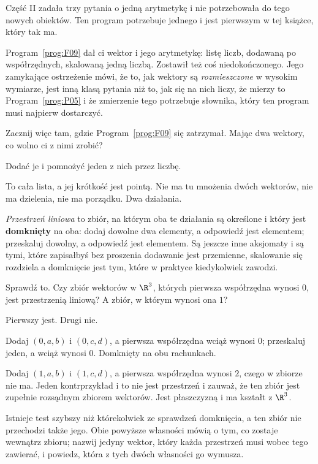 \begin{fr}
Część II zadała trzy pytania o jedną arytmetykę i nie potrzebowała do tego
nowych obiektów. Ten program potrzebuje jednego i jest pierwszym w tej książce,
który tak ma.

Program~\ref{prog:F09} dał ci wektor i jego arytmetykę: listę liczb, dodawaną
po współrzędnych, skalowaną jedną liczbą. Zostawił też coś niedokończonego.
Jego zamykające ostrzeżenie mówi, że to, jak wektory są \emph{rozmieszczone} w
wysokim wymiarze, jest inną klasą pytania niż to, jak się na nich liczy, że
mierzy to Program~\ref{prog:P05} i że zmierzenie tego potrzebuje słownika,
który ten program musi najpierw dostarczyć.

Zacznij więc tam, gdzie Program~\ref{prog:F09} się zatrzymał. Mając dwa
wektory, co wolno ci z nimi zrobić?
\nextframe
\end{fr}

\begin{fr}
\begin{ansblock}
Dodać je i pomnożyć jeden z nich przez liczbę.
\end{ansblock}

To cała lista, a jej krótkość jest pointą. Nie ma tu mnożenia dwóch wektorów,
nie ma dzielenia, nie ma porządku. Dwa działania.

\emph{Przestrzeń liniowa} to zbiór, na którym oba te działania są określone i
który jest \textbf{domknięty} na oba: dodaj dowolne dwa elementy, a odpowiedź
jest elementem; przeskaluj dowolny, a odpowiedź jest elementem. Są jeszcze inne
aksjomaty i są tymi, które zapisałbyś bez proszenia \dash{} dodawanie jest
przemienne, skalowanie się rozdziela \dash{} a domknięcie jest tym, które w
praktyce kiedykolwiek zawodzi.

Sprawdź to. Czy zbiór wektorów w $\R^{3}$, których pierwsza współrzędna wynosi
$0$, jest przestrzenią liniową? A zbiór, w którym wynosi ona $1$?
\nextframe
\end{fr}

\begin{fr}
\begin{ansblock}
Pierwszy jest. Drugi nie.
\end{ansblock}

Dodaj $(0, a, b)$ i $(0, c, d)$, a pierwsza współrzędna wciąż wynosi $0$;
przeskaluj jeden, a wciąż wynosi $0$. Domknięty na obu rachunkach.

Dodaj $(1, a, b)$ i $(1, c, d)$, a pierwsza współrzędna wynosi $2$, czego w
zbiorze nie ma. Jeden kontrprzykład i to nie jest przestrzeń \dash{} i zauważ,
że ten zbiór jest zupełnie rozsądnym zbiorem wektorów. Jest płaszczyzną i ma
kształt z $\R^{3}$.

Istnieje test szybszy niż którekolwiek ze sprawdzeń domknięcia, a ten zbiór nie
przechodzi także jego. Obie powyższe własności mówią o tym, co zostaje wewnątrz
zbioru; nazwij jedyny wektor, który każda przestrzeń musi wobec tego zawierać,
i powiedz, która z tych dwóch własności go wymusza.
\dotline
\nextframe
\end{fr}

